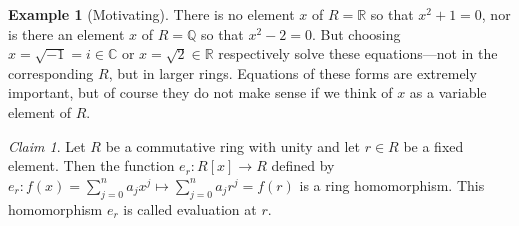 \documentclass[12pt,letterpaper,DIV=11,final]{scrartcl}
\theoremstyle{plain}
\theoremstyle{definition}
\newtheorem{example}{Example}[section]
\theoremstyle{remark}
\newtheorem{claim}{Claim}
\begin{document}
\begin{example}[Motivating]
  There is no element $x$ of $R = \mathbb{R}$ so that $x^2 + 1 = 0$, nor is there an element $x$ of $R = \mathbb{Q}$ so that $x^2 - 2 = 0$.
  But choosing $x = \sqrt{-1} = i \in \mathbb{C}$ or $x = \sqrt{2} \in \mathbb{R}$ respectively solve these equations---not in the corresponding $R$, but in larger rings.
  Equations of these forms are extremely important, but of course they do not make sense if we think of $x$ as a variable element of $R$.
\end{example}

\begin{claim}\label{claim:evalhomomorphism}
  Let $R$ be a commutative ring with unity and let $r \in R$ be a fixed element.
  Then the function $e_r : R[x] \to R$ defined by $e_r : f(x) = \sum_{j = 0}^n a_j x^j \mapsto \sum_{j = 0}^n a_j r^j = f(r)$ is a ring homomorphism.
  This homomorphism $e_r$ is called evaluation at $r$.


\end{claim}
\end{document}
